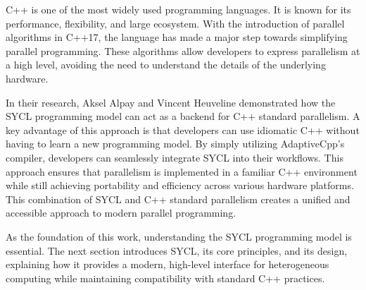 C++ is one of the most widely used programming languages. It is known for its performance, flexibility, and large 
ecosystem. With the introduction of parallel algorithms in C++17, the language has made a major step towards 
simplifying parallel programming. These algorithms allow developers to express parallelism at a high level, avoiding 
the need to understand the details of the underlying hardware.

In their research, Aksel Alpay and Vincent Heuveline demonstrated how the SYCL programming model can act as a backend 
for C++ standard parallelism. A key advantage of this approach is that developers can use idiomatic C++ without having 
to learn a new programming model. By simply utilizing AdaptiveCpp’s compiler, developers can seamlessly integrate SYCL 
into their workflows. This approach ensures that parallelism is implemented in a familiar C++ environment while still 
achieving portability and efficiency across various hardware platforms. This combination of SYCL and C++ standard 
parallelism creates a unified and accessible approach to modern parallel programming.
\cite{alpay2021}

As the foundation of this work, understanding the SYCL programming model is essential. The next section introduces 
SYCL, its core principles, and its design, explaining how it provides a modern, high-level interface for heterogeneous 
computing while maintaining compatibility with standard C++ practices.
